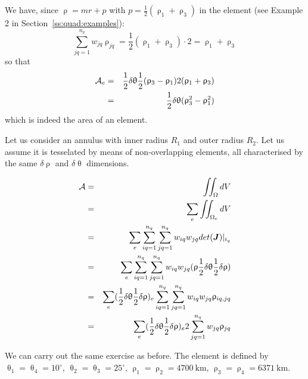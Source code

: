 We have, since $\uprho = mr+p $ with $p=\frac12 (\uprho_1+\uprho_3)$ in the element (see Example 2 in Section~\ref{ss:quad:examples}):
\[ 
\sum_{jq=1}^{n_q}  w_{jq} \uprho_{jq} = \frac12 (\uprho_1+\uprho_3)  \cdot 2 = \uprho_1+\uprho_3
\]
so that 
\begin{eqnarray}
{\cal A}_e
&=&\frac12 \delta \uptheta  \frac12 (\uprho_3-\uprho_1)  2 (\uprho_1+\uprho_3) \nonumber\\
&=&\frac12 \delta \uptheta (\uprho_3^2-\uprho_1^2) 
\end{eqnarray}
which is indeed the area of an element.






\newpage
Let us consider an annulus with inner radius $R_1$ and outer radius $R_2$. Let us assume it is tesselated 
by means of non-overlapping elements, all characterised by the same $\delta\uprho$ and $\delta\uptheta$ 
dimensions.


\begin{eqnarray}
{\cal A}
&=&\iint_\Omega dV  \nonumber\\
&=&\sum_e \iint_{\Omega_e} dV  \nonumber\\
&=&\sum_e \sum_{iq=1}^{n_q} \sum_{jq=1}^{n_q}   w_{iq} w_{jq} det({\bm J})|_{i_q} \nonumber\\
&=&\sum_e \sum_{iq=1}^{n_q} \sum_{jq=1}^{n_q}   w_{iq} w_{jq} (\uprho  \frac12 \delta \uptheta  \frac12 \delta\uprho ) \nonumber\\
&=&\sum_e  (\frac12 \delta \uptheta  \frac12 \delta\uprho)_e  \sum_{iq=1}^{n_q} \sum_{jq=1}^{n_q}   w_{iq} w_{jq} \uprho_{iq,jq} \nonumber\\
&=&\sum_e  (\frac12 \delta \uptheta  \frac12 \delta\uprho)_e  2  \sum_{jq=1}^{n_q}  w_{jq} \uprho_{jq} \nonumber\\
\end{eqnarray}




\newpage 
We can carry out the same exercise as before.
The element is defined by 
$\uptheta_1=\uptheta_4=10^\circ$,
$\uptheta_2=\uptheta_3=25^\circ$,
$\uprho_1=\uprho_2=4700~\si{\km}$,
$\uprho_3=\uprho_4=6371~\si{\km}$.

